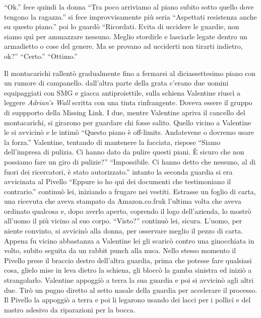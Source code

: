     ``Ok.'' fece quindi la donna ``Tra poco arriviamo al piano subito sotto quello dove tengono la ragazza.'' si fece
    improvvisamente più seria ``Aspettati resistenza anche su questo piano.'' poi lo guardò ``Ricordati. Evita di
    uccidere le guardie, non siamo quì per ammazzare nessuno. Meglio stordirle e lasciarle legate dentro un armadietto o
    cose del genere. Ma se provano ad ucciderti non tirarti indietro, ok?'' ``Certo.'' ``Ottimo.''

    Il montacarichi rallentò gradualmente fino a fermarsi al diciassettesimo piano con un rumore di campanello.
    dall'altra parte della grata c'erano due uomini equipaggiati con SMG e giacca antiproiettile, sulla schiena
    Valentine riuscì a leggere \emph{Adrian's Wall} scritta con una tinta rinfrangente. Doveva essere il gruppo di
    suppporto della Missing Link. I due, mentre Valentine apriva il cancello del montacarichi, si girarono per guardare
    chi fosse salito. Quello vicino a Valentine le si avvicinò e le intimò ``Questo piano è off-limits. Andatevene o
    dovremo usare la forza.'' Valentine, tentando di mantenere la facciata, rispose ``Siamo dell'impresa di pulizia. Ci
    hanno dato da pulire questi piani. È sicuro che non possiamo fare un giro di pulizie?'' ``Impossibile. Ci hanno
    detto che nessuno, al di fuori dei ricercatori, è stato autorizzato.'' intanto la seconda guardia si era avvicinata
    al Pivello ``Eppure io ho quì dei documenti che testimoniano il contrario.'' continuò lei, iniziando a frugare nei
    vestiti. Estrasse un foglio di carta, una ricevuta che aveva stampato da Amazon.co.fruk l'ultima volta che aveva
    ordinato qualcosa e, dopo averlo aperto, coprendo il logo dell'azienda, lo mostrò all'uomo il più vicino al suo
    corpo. ``Visto?'' continuò lei, sicura. L'uomo, per niente convinto, si avvicinò alla donna, per osservare meglio il
    pezzo di carta. Appena fu vicino abbastanza a Valentine lei gli scaricò contro una ginocchiata in volto, subito
    seguita da un rabbit punch alla nuca. Nello stesso momento il Pivello prese il braccio destro dell'altra guardia,
    prima che potesse fare qualsiasi cosa, glielo mise in leva dietro la schiena, gli bloccò la gamba sinistra ed iniziò
    a strangolarlo. Valentine appoggiò a terra la sua guardia e poi si avvicinò agli altri due. Tirò un pugno diretto al
    setto nasale della guardia per accelerare il processo. Il Pivello la appoggiò a terra e poi li legarono usando dei
    lacci per i pollici e del nastro adesivo da riparazioni per la bocca.

